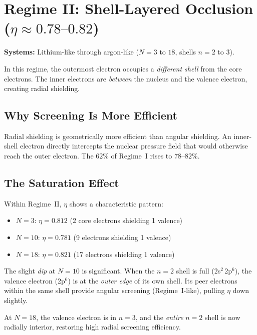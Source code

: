 \section{Regime II: Shell-Layered Occlusion ($\eta \approx 0.78\text{--}0.82$)}
\label{sec:regime2}

\textbf{Systems:} Lithium-like through argon-like ($N = 3$ to $18$, shells $n = 2$ to $3$).

In this regime, the outermost electron occupies a \emph{different shell} from the core electrons.  The inner electrons are \emph{between} the nucleus and the valence electron, creating radial shielding.

\subsection{Why Screening Is More Efficient}

Radial shielding is geometrically more efficient than angular shielding.  An inner-shell electron directly intercepts the nuclear pressure field that would otherwise reach the outer electron.  The $62\%$ of Regime~I rises to $78\text{--}82\%$.

\subsection{The Saturation Effect}

Within Regime~II, $\eta$ shows a characteristic pattern:
\begin{itemize}
  \item $N = 3$: $\eta = 0.812$ (2 core electrons shielding 1 valence)
  \item $N = 10$: $\eta = 0.781$ (9 electrons shielding 1 valence)
  \item $N = 18$: $\eta = 0.821$ (17 electrons shielding 1 valence)
\end{itemize}

The slight \emph{dip} at $N = 10$ is significant.  When the $n = 2$ shell is full (2s$^2$\,2p$^6$), the valence electron (2p$^6$) is at the \emph{outer edge} of its own shell.  Its peer electrons within the same shell provide angular screening (Regime~I-like), pulling $\eta$ down slightly.

At $N = 18$, the valence electron is in $n = 3$, and the \emph{entire} $n = 2$ shell is now radially interior, restoring high radial screening efficiency.

